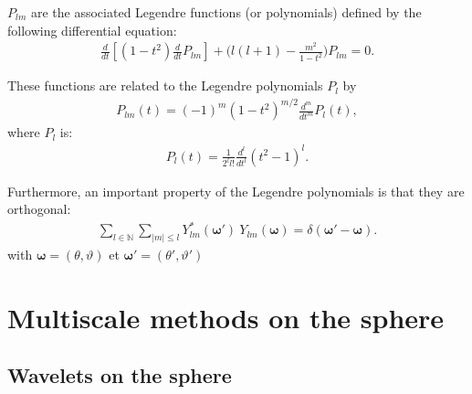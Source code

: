 $P_{lm}$ are the  associated Legendre functions (or polynomials) defined by the following differential equation:
\begin{eqnarray}
\label{def_poly_legendre}
\frac{d}{dt} \left[     (1-t^2)   \frac{d}{dt} P_{lm}  \right]   + \Big( l(l+1) - \frac{m^2}{1-t^2}\Big) P_{lm} = 0  .
\end{eqnarray}

These functions are related to the Legendre polynomials $P_{l}$ by 
\begin{eqnarray}
P_{lm}(t)  = (-1)^m (1-t^2)^{m/2}\frac{d^m}{dt^m}P_l(t) ,
\label{def_poly_leg}
\end{eqnarray}
where  $P_l$  is:
\begin{eqnarray}
P_{l}(t)  =\frac{1}{2^l l!}  \frac{d^l}{dt^l} (t^2-1)^l .
\label{def_pl}
\end{eqnarray}

Furthermore, an important property of the Legendre polynomials is that they are orthogonal:  
\begin{eqnarray}
\label{ortho_harm_sph}
\sum_{l\in\mathbb{N}} \sum_{|m|\leqslant l} Y^*_{lm}({\boldsymbol \omega}') \ Y_{lm}({\boldsymbol \omega}) = \delta({\boldsymbol \omega}' - {\boldsymbol \omega}) .
\end{eqnarray}
with ${\boldsymbol \omega} = (\theta,\vartheta)$ et ${\boldsymbol \omega}' = (\theta',\vartheta')$



\section{Multiscale methods on the sphere}
\label{intro_multi_sph}

\subsection{Wavelets on the sphere}

